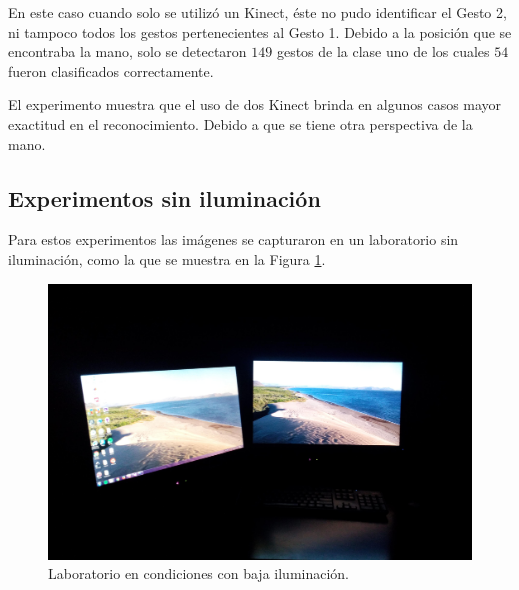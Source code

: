 \begin{itemize}
En este caso cuando solo se utiliz\'o un Kinect, \'este no pudo identificar el Gesto 2, ni tampoco todos los gestos pertenecientes al Gesto 1. Debido a la posición que se encontraba la mano, solo se detectaron $149$ gestos de la clase uno de los cuales $54$ fueron clasificados correctamente.

El experimento muestra que el uso de dos Kinect brinda en algunos casos mayor exactitud en el reconocimiento. Debido a que se tiene otra perspectiva de la mano. 

\end{itemize}


\subsection{Experimentos sin iluminación}
Para estos experimentos las imágenes se capturaron en un laboratorio sin iluminación, como la que se muestra en la Figura \ref{fig:LabNoIluminado}.

\begin{figure}[h!]
\begin{center} 
\includegraphics[scale=0.09]{./Figures/noIluminacion.jpg}
\end{center}
\caption{Laboratorio en condiciones con baja iluminación.}
\label{fig:LabNoIluminado} 
\end{figure} 


